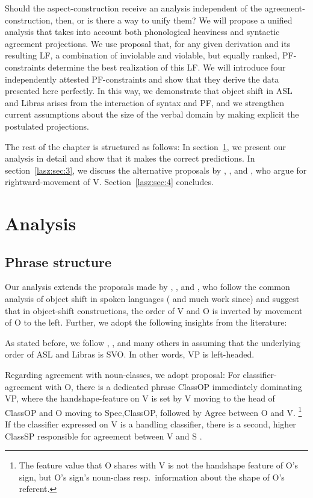 \documentclass[output=paper]{langscibook}
\begin{document}
Should the aspect-construction receive an analysis independent
of the agree\-ment-con\-struc\-tion, then, or is there a way to unify them?
We will propose a unified analysis that takes into account both
phonological heaviness and syntactic agreement projections. We use
 proposal that, for any given
derivation and its resulting LF, a combination of inviolable and
violable, but equally ranked, PF-constraints determine the best
realization of this LF. We will introduce four independently attested
PF-constraints and show that they derive the data presented here
perfectly. In this way, we demonstrate that object shift in ASL and
Libras arises from the interaction of syntax and PF, and we strengthen
current assumptions about the size of the verbal domain by making
explicit the postulated projections.

The rest of the chapter is structured as follows: In section~\ref{lasz:sec:2}, we
present our analysis in detail and show that it makes the correct
predictions. In section~\ref{lasz:sec:3}, we discuss the alternative proposals by
\citet{Fischer.Janis.1992}, \citet{Matsuoka.1997}, and \citet{Braze.2004}, who
argue for rightward-movement of V. Section~\ref{lasz:sec:4} concludes.

\section{Analysis}
\label{lasz:sec:2}
    
\subsection{Phrase structure}
\label{lasz:sec:21}

Our analysis extends the proposals made by \citet{Quadros.etal.2004}, 
\citet{Quadros.DLM.2010}, and \citet{Gokgoz.2013}, who follow the
common analysis of object shift in spoken languages (\citealp{Holmberg:1986}
and much work since) and suggest that in object-shift constructions,
the order of V and O is inverted by movement of O to the left. Further,
we adopt the following insights from the literature:

As stated before, we follow \citet{Fischer.1975}, \citet{Liddell.1980},
\citet{Quadros.1999} and many others in assuming that the underlying order
of ASL and Libras is SVO. In other words, VP is left-headed.

Regarding agreement with noun-classes, we adopt 
proposal: For classifier-agreement with O, there is
a dedicated phrase ClassOP immediately dominating VP, where the
handshape-feature on V is set by V moving to the head of ClassOP and O
moving to Spec,ClassOP, followed by Agree between O and V.%
\footnote{
    The feature value that O shares with V is not the handshape feature of O’s
    sign, but O’s sign’s noun-class resp.~information about the shape of O’s referent.
}
If the
classifier expressed on V is a handling classifier, there is a second,
higher ClassSP responsible for agreement between V and S \citep{Benedicto.Brentari.2004}.
\end{document}
